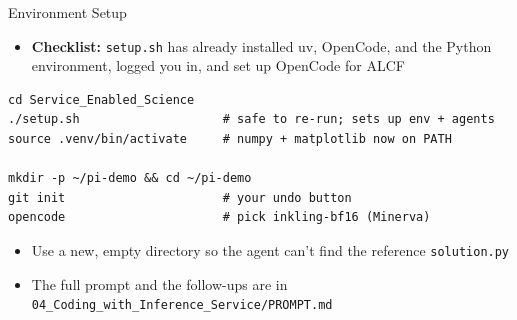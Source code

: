 \documentclass[10pt,aspectratio=169]{beamer}
\begin{document}
\begin{frame}[fragile]{Environment Setup}
  \begin{itemize}
    \item \textbf{Checklist:} \texttt{setup.sh} has already installed uv,
      OpenCode, and the Python environment, logged you in, and set up
      OpenCode for ALCF
  \end{itemize}
  \begin{verbatim}
cd Service_Enabled_Science
./setup.sh                    # safe to re-run; sets up env + agents
source .venv/bin/activate     # numpy + matplotlib now on PATH

mkdir -p ~/pi-demo && cd ~/pi-demo
git init                      # your undo button
opencode                      # pick inkling-bf16 (Minerva)
  \end{verbatim}
  \pause
  \begin{itemize}
    \item Use a new, empty directory so the agent can't find the
      reference \texttt{solution.py}
      \pause
    \item The full prompt and the follow-ups are in
      \texttt{04\_Coding\_with\_Inference\_Service/PROMPT.md}
  \end{itemize}
\end{frame}
\end{document}
